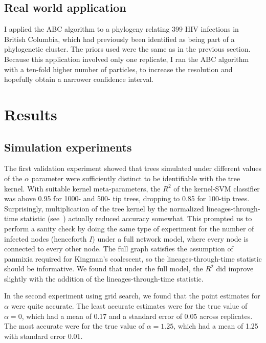 \documentclass{article}
\begin{document}
\subsection{Real world application}

I applied the ABC algorithm to a phylogeny relating 399 HIV infections in
British Columbia, which had previously been identified as being part of a
phylogenetic cluster. The priors used were the same as in the previous section.
Because this application involved only one replicate, I ran the ABC algorithm
with a ten-fold higher number of particles, to increase the resolution and
hopefully obtain a narrower confidence interval.

\section{Results}

\subsection{Simulation experiments}

The first validation experiment showed that trees simulated under different
values of the $\alpha$ parameter were sufficiently distinct to be identifiable
with the tree kernel. With suitable kernel meta-parameters, the $R^2$ of the
kernel-SVM classifier was above 0.95 for 1000- and 500- tip trees, dropping to
0.85 for 100-tip trees. Surprisingly, multiplication of the tree kernel by the
normalized lineages-through-time statistic
(see~\autocite{janzen2015approximate}) actually reduced accuracy somewhat. This
prompted us to perform a sanity check by doing the same type of experiment for
the number of infected nodes (henceforth $I$) under a full network model, where
every node is connected to every other node. The full graph satisfies the
assumption of panmixia required for Kingman's coalescent, so the
lineages-through-time statistic should be informative. We found that under the
full model, the $R^2$ did improve slightly with the addition of the
lineages-through-time statistic.

In the second experiment using grid search, we found that the point estimates
for $\alpha$ were quite accurate. The least accurate estimates were for the
true value of $\alpha = 0$, which had a mean of 0.17 and a standard error of
0.05 across replicates. The most accurate were for the true value of $\alpha =
1.25$, which had a mean of 1.25 with standard error 0.01. 
\end{document}
